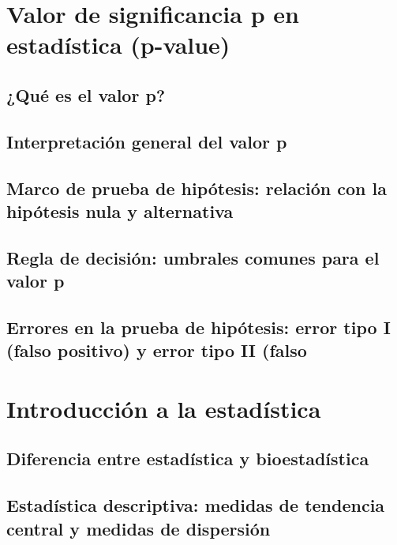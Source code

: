 \documentclass[
]{book}
\begin{document}
\chapter{Valor de significancia p en estadística (p-value)}\label{valor-de-significancia-p-en-estaduxedstica-p-value}

\section{¿Qué es el valor p?}\label{quuxe9-es-el-valor-p}

\section{Interpretación general del valor p}\label{interpretaciuxf3n-general-del-valor-p}

\section{Marco de prueba de hipótesis: relación con la hipótesis nula y alternativa}\label{marco-de-prueba-de-hipuxf3tesis-relaciuxf3n-con-la-hipuxf3tesis-nula-y-alternativa}

\section{Regla de decisión: umbrales comunes para el valor p}\label{regla-de-decisiuxf3n-umbrales-comunes-para-el-valor-p}

\section{Errores en la prueba de hipótesis: error tipo I (falso positivo) y error tipo II (falso}\label{errores-en-la-prueba-de-hipuxf3tesis-error-tipo-i-falso-positivo-y-error-tipo-ii-falso}

\chapter{Introducción a la estadística}\label{introducciuxf3n-a-la-estaduxedstica}

\section{Diferencia entre estadística y bioestadística}\label{diferencia-entre-estaduxedstica-y-bioestaduxedstica}

\section{Estadística descriptiva: medidas de tendencia central y medidas de dispersión}\label{estaduxedstica-descriptiva-medidas-de-tendencia-central-y-medidas-de-dispersiuxf3n}
\end{document}
